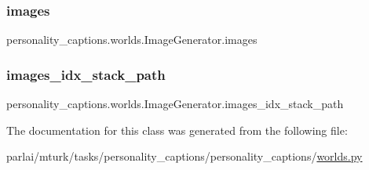 \subsubsection{\texorpdfstring{images}{images}}
{\footnotesize\ttfamily personality\+\_\+captions.\+worlds.\+Image\+Generator.\+images}

\mbox{\label{classpersonality__captions_1_1worlds_1_1ImageGenerator_a3cb7292fe4be4bd3e9c1e16e763da509}} 
\subsubsection{\texorpdfstring{images\+\_\+idx\+\_\+stack\+\_\+path}{images\_idx\_stack\_path}}
{\footnotesize\ttfamily personality\+\_\+captions.\+worlds.\+Image\+Generator.\+images\+\_\+idx\+\_\+stack\+\_\+path}



The documentation for this class was generated from the following file\+:\begin{DoxyCompactItemize}
\item 
parlai/mturk/tasks/personality\+\_\+captions/personality\+\_\+captions/\hyperlink{parlai_2mturk_2tasks_2personality__captions_2personality__captions_2worlds_8py}{worlds.\+py}\end{DoxyCompactItemize}
